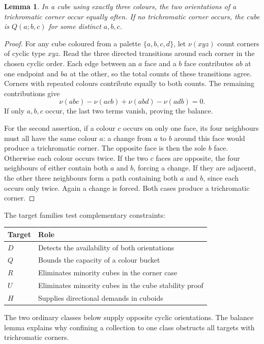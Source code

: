 \documentclass[11pt]{article}
\newtheorem{lemma}{Lemma}
\theoremstyle{remark}
\begin{document}
\begin{lemma}\label{lem:balance}
In a cube using exactly three colours, the two orientations of a
trichromatic corner occur equally often. If no trichromatic corner occurs,
the cube is $Q(a;b,c)$ for some distinct $a,b,c$.
\end{lemma}
\begin{proof}
For any cube coloured from a palette $\{a,b,c,d\}$, let $\nu(xyz)$ count
corners of cyclic type $xyz$. Read the three directed transitions around
each corner in the chosen cyclic order. Each edge between an $a$ face
and a $b$ face contributes $ab$ at one endpoint and $ba$ at the other,
so the total counts of these transitions agree. Corners with repeated
colours contribute equally to both counts. The remaining contributions give
\begin{equation}\label{eq:edge-balance}
 \nu(abc)-\nu(acb)+\nu(abd)-\nu(adb)=0.
\end{equation}
If only $a,b,c$ occur, the last two terms vanish, proving the balance.

For the second assertion, if a colour $c$ occurs on only one face, its
four neighbours must all have the same colour $a$: a change from $a$ to
$b$ around this face would produce a trichromatic corner. The opposite
face is then the sole $b$ face. Otherwise each colour occurs twice.
If the two $c$ faces are opposite, the four neighbours of either contain
both $a$ and $b$, forcing a change. If they are adjacent, the other three
neighbours form a path containing both $a$ and $b$, since each occurs only
twice. Again a change is forced. Both cases produce a trichromatic corner.
\end{proof}

The target families test complementary constraints:
\begin{center}
\begin{tabular}{ll}
\toprule
Target & Role\\
\midrule
$D$ & Detects the availability of both orientations\\
$Q$ & Bounds the capacity of a colour bucket\\
$R$ & Eliminates minority cubes in the corner case\\
$U$ & Eliminates minority cubes in the cube stability proof\\
$H$ & Supplies directional demands in cuboids\\
\bottomrule
\end{tabular}
\end{center}
The two ordinary classes below supply opposite cyclic orientations. The
balance lemma explains why confining a collection to one class obstructs
all targets with trichromatic corners.
\end{document}
